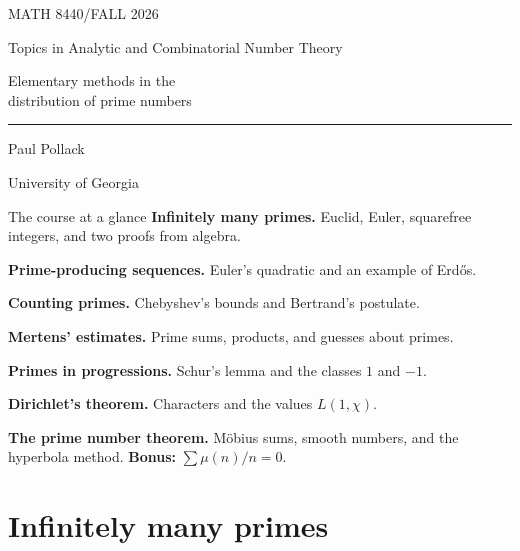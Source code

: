 \documentclass[aspectratio=169,11pt]{beamer}
\begin{document}
\begingroup
{}
\begin{frame}[plain,t]{}
\color{white}
\vspace{.6cm}
{\color[HTML]{DFB86D}\large MATH 8440\quad/\quad FALL 2026}\par
Topics in Analytic and Combinatorial Number Theory\par
\vspace{.85cm}
{\rmfamily\fontsize{27}{32}\selectfont Elementary methods in the\\distribution of prime numbers\par}
\vspace{.65cm}
{\color[HTML]{DFB86D}\rule{2.6cm}{.7pt}}\par
\vspace{.5cm}
Paul Pollack\par
University of Georgia
\end{frame}
\endgroup
\begin{frame}[label=overview]{The course at a glance}
\small
\textbf{Infinitely many primes.} Euclid, Euler, squarefree integers, and two proofs from algebra.

\textbf{Prime-producing sequences.} Euler's quadratic and an example of Erd\H{o}s.

\textbf{Counting primes.} Chebyshev's bounds and Bertrand's postulate.

\textbf{Mertens' estimates.} Prime sums, products, and guesses about primes.

\textbf{Primes in progressions.} Schur's lemma and the classes $1$ and $-1$.

\textbf{Dirichlet's theorem.} Characters and the values $L(1,\chi)$.

\textbf{The prime number theorem.} M\"obius sums, smooth numbers, and the hyperbola method. \textbf{Bonus:} $\sum\mu(n)/n=0$.
\end{frame}
\section{Infinitely many primes}
\end{document}

